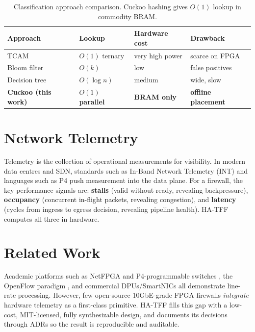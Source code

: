 \documentclass[12pt,twoside,openright]{book}
\begin{document}
\begin{table}[H]
\centering
\footnotesize
\begin{tabularx}{0.95\textwidth}{lXXX}
\toprule
\textbf{Approach} & \textbf{Lookup} & \textbf{Hardware cost} & \textbf{Drawback} \\
\midrule
TCAM & $O(1)$ ternary & very high power & scarce on FPGA \\
Bloom filter & $O(k)$ & low & false positives \\
Decision tree & $O(\log n)$ & medium & wide, slow \\
\textbf{Cuckoo (this work)} & \textbf{$O(1)$ parallel} & \textbf{BRAM only} & \textbf{offline placement} \\
\bottomrule
\end{tabularx}
\caption{Classification approach comparison. Cuckoo hashing gives $O(1)$ lookup in commodity BRAM.}
\label{tab:approaches}
\end{table}

\section{Network Telemetry}

Telemetry is the collection of operational measurements for visibility. In modern data centres and
SDN, standards such as In-Band Network Telemetry (INT) and languages such as P4 \cite{bosshart2014}
push measurement into the data plane. For a firewall, the key performance signals are:
\textbf{stalls} (valid without ready, revealing backpressure), \textbf{occupancy} (concurrent
in-flight packets, revealing congestion), and \textbf{latency} (cycles from ingress to egress
decision, revealing pipeline health). HA-TFF computes all three in hardware.

\section{Related Work}

Academic platforms such as NetFPGA \cite{lockwood2007} and P4-programmable switches
\cite{bosshart2014}, the OpenFlow paradigm \cite{mckeown2008}, and commercial DPUs/SmartNICs
\cite{smartnic2021} all demonstrate line-rate processing. However, few open-source 10GbE-grade
FPGA firewalls \emph{integrate} hardware telemetry as a first-class primitive. HA-TFF fills this
gap with a low-cost, MIT-licensed, fully synthesizable design, and documents its decisions through
ADRs so the result is reproducible and auditable.
\end{document}
